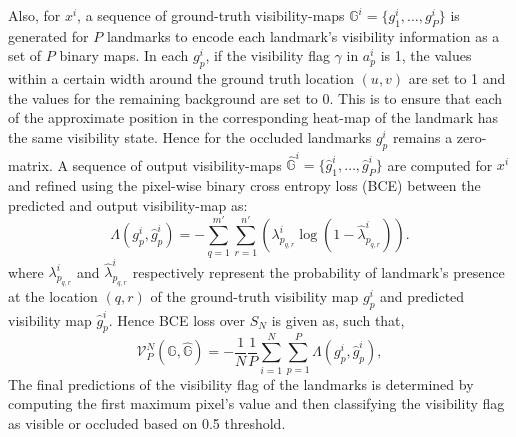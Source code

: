 \documentclass[conference]{IEEEtran}
\begin{document}
Also, for $x^i$, a sequence of ground-truth visibility-maps $\mathbb{G}^i= \{ g^i_1,\dots ,g^i_P \}$ is generated for $P$ landmarks to encode each landmark's visibility information as a set of $P$ binary maps. In each $g^i_p$, if the visibility flag $\gamma$ in $a^i_p$ is 1, the values within a certain width around the ground truth location $(u , v)$ are set to 1 and the values for the remaining background are set to 0. This is to ensure that each of the approximate position in the corresponding heat-map of the landmark has the same visibility state.  Hence for the occluded landmarks $g^i_p$ remains a zero-matrix. A sequence of output visibility-maps $\hat{\mathbb{G}}^i= \{\hat{g}^i_1,\dots ,\hat{g}^i_P \}$ are computed for $x^i$ and refined using the pixel-wise binary cross entropy loss (BCE) between the predicted and output visibility-map as:
% 
\begin{equation}
  \Lambda ( g^i_{p} , \hat{g}^i_p) = - \sum_{q = 1}^{m'} \sum_{r = 1}^{n'}{(\lambda^i_{p_{q,r}} \log(1 - \hat{\lambda}^i_{p_{q,r}})) }.
\end{equation}
%
where $\lambda^i_{p_{q,r}}$ and $\hat{\lambda}^i_{p_{q,r}}$ respectively represent the probability of landmark's presence at the location $(q,r)$  of the ground-truth visibility map $g^i_p$ and predicted visibility map $\hat{g}^i_p$. Hence BCE loss over $S_N$ is given as, such that,  
% 
\begin{equation}
  \mathcal{V}^N_P (\mathbb{G}, \hat{\mathbb{G}}) = - \frac{1}{N} \frac{1}{P} \sum_{i = 1}^{N} \sum_{p = 1}^{P} \Lambda (g^i_{p} , \hat{g}^i_p),
\end{equation}
%
The final predictions of the visibility flag of the landmarks is determined by computing the first maximum pixel's value and then classifying the visibility flag as visible or occluded based on 0.5 threshold.
\end{document}
